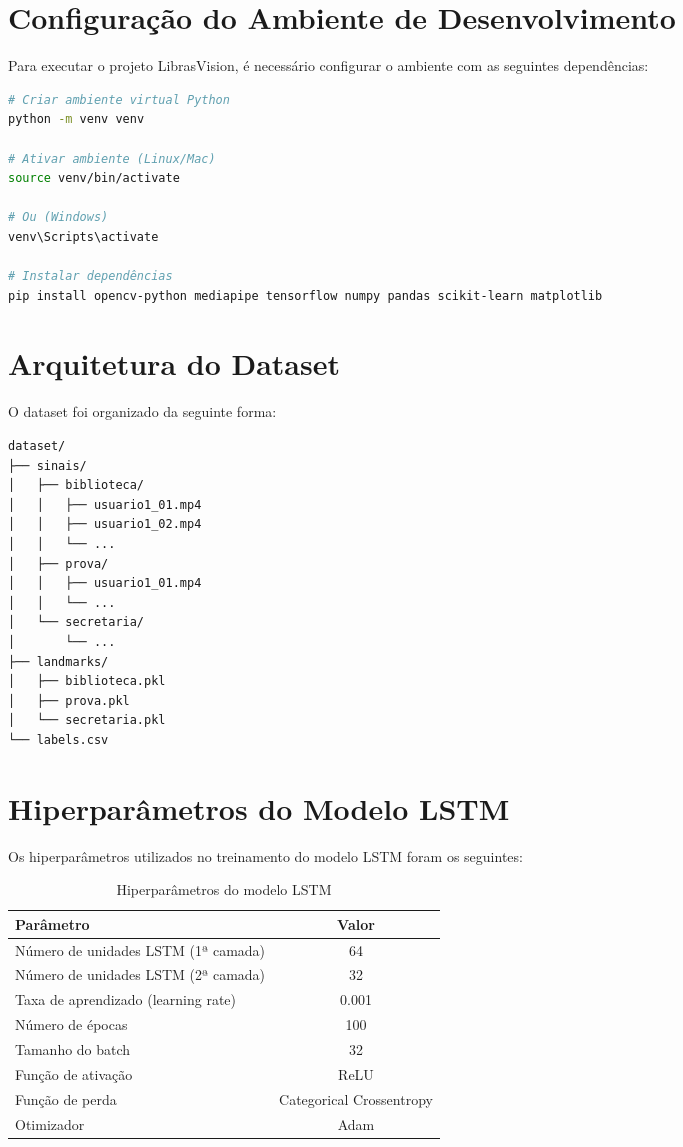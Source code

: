 \section{Configuração do Ambiente de Desenvolvimento}

Para executar o projeto LibrasVision, é necessário configurar o ambiente com as seguintes dependências:

\begin{lstlisting}[language=bash]
# Criar ambiente virtual Python
python -m venv venv

# Ativar ambiente (Linux/Mac)
source venv/bin/activate

# Ou (Windows)
venv\Scripts\activate

# Instalar dependências
pip install opencv-python mediapipe tensorflow numpy pandas scikit-learn matplotlib
\end{lstlisting}

\section{Arquitetura do Dataset}

O dataset foi organizado da seguinte forma:

\begin{verbatim}
dataset/
├── sinais/
│   ├── biblioteca/
│   │   ├── usuario1_01.mp4
│   │   ├── usuario1_02.mp4
│   │   └── ...
│   ├── prova/
│   │   ├── usuario1_01.mp4
│   │   └── ...
│   └── secretaria/
│       └── ...
├── landmarks/
│   ├── biblioteca.pkl
│   ├── prova.pkl
│   └── secretaria.pkl
└── labels.csv
\end{verbatim}

\section{Hiperparâmetros do Modelo LSTM}

Os hiperparâmetros utilizados no treinamento do modelo LSTM foram os seguintes:

\begin{table}[htb]
    \centering
    \caption{Hiperparâmetros do modelo LSTM}
    \label{tab:hiperparametros}
    \begin{tabular}{|l|c|}
        \hline
        \textbf{Parâmetro} & \textbf{Valor} \\
        \hline
        Número de unidades LSTM (1ª camada) & 64 \\
        Número de unidades LSTM (2ª camada) & 32 \\
        Taxa de aprendizado (learning rate) & 0.001 \\
        Número de épocas & 100 \\
        Tamanho do batch & 32 \\
        Função de ativação & ReLU \\
        Função de perda & Categorical Crossentropy \\
        Otimizador & Adam \\
        \hline
    \end{tabular}
\end{table}

